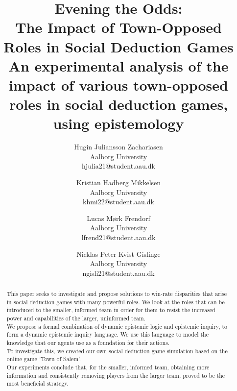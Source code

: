 \documentclass[twocolumn]{article}
\begin{document}

\title{Evening the Odds:\\ The Impact of Town-Opposed Roles in Social Deduction
	Games\\ \small An experimental analysis of the impact of various
	town-opposed roles in social deduction games, using epistemology}
\author{
	Hugin Juliansson Zachariasen \\ Aalborg University \\ hjulia21@student.aau.dk
	\and
	Kristian Hadberg Mikkelsen \\ Aalborg University \\ khmi22@student.aau.dk
	\and
	Lucas Mørk Frendorf \\ Aalborg University \\ lfrend21@student.aau.dk
	\and
	Nicklas Peter Kvist Gislinge \\ Aalborg University \\ ngisli21@student.aau.dk
}
\maketitle
\begin{abstract}
	This paper seeks to investigate and propose solutions to win-rate disparities that arise in social deduction games with many powerful roles. We look at the roles that can be introduced to the smaller, informed team in order for them to resist the increased power and capabilities of the larger, uninformed team.\\
	We propose a formal combination of dynamic epistemic logic and epistemic inquiry, to form a dynamic epistemic inquiry language. We use this language to model the knowledge that our agents use as a foundation for their actions.\\
	To investigate this, we created our own social
	deduction game simulation based on the online game
	'Town of Salem'\cite{TownOfSalem}.\\
	Our experiments conclude that, for the smaller, informed team, obtaining more information and consistently removing players from the larger team, proved to be the most beneficial strategy.
\end{abstract}











\clearpage
\appendix
\makeatletter
\def\@seccntformat#1{\appendixname\ \csname the#1\endcsname: }
\makeatother




\clearpage
\printbibliography[heading=bibintoc, title=Bibliography]
\label{bib:mybiblio}
\end{document}
